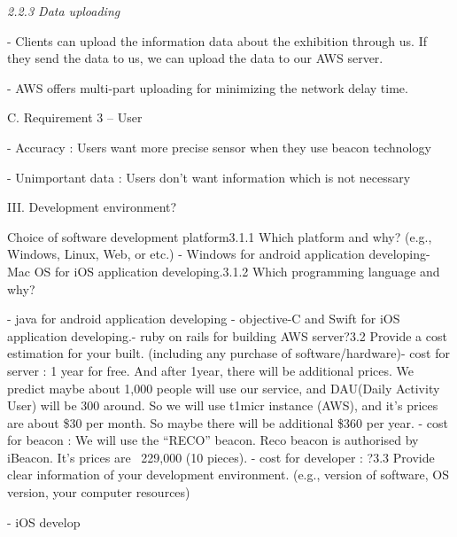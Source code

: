 \documentclass{article}
\begin{document}
\noindent 

\noindent \textit{2.2.3 Data uploading}

\noindent - Clients can upload the information data about the exhibition through us. If they send the data to us, we can upload the data to our AWS server. 

\noindent - AWS offers multi-part uploading for minimizing the network delay time.

\noindent 

\noindent 

\noindent 

\noindent C. Requirement 3 -- User

\noindent 

\noindent - Accuracy : Users want more precise sensor when they use beacon technology

\noindent 

\noindent - Unimportant data : Users don't want information which is not necessary

\noindent 

\noindent 

\noindent 

\noindent 

\noindent 

\noindent III. Development environment?

 Choice of software development platform3.1.1 Which platform and why? (e.g., Windows, Linux, Web, or etc.) - Windows for android application developing- Mac OS for iOS application developing.3.1.2 Which programming language and why?

\noindent - java for android application developing - objective-C and Swift for iOS application developing.- ruby on rails for building AWS server?3.2 Provide a cost estimation for your built. (including any purchase of software/hardware)- cost for server : 1 year for free. And after 1year, there will be additional prices. We predict maybe about 1,000 people will use our service, and DAU(Daily Activity User) will be 300 around. So we will use t1micr instance (AWS), and it's prices are about \$30 per month. So maybe there will be additional \$360 per year.  - cost for beacon : We will use the ``RECO'' beacon. Reco beacon is authorised by iBeacon. It's prices are \ 229,000 (10 pieces). - cost for developer : ?3.3 Provide clear information of your development environment. (e.g., version of software, OS version, your computer resources) 

\noindent - iOS develop 
\end{document}
